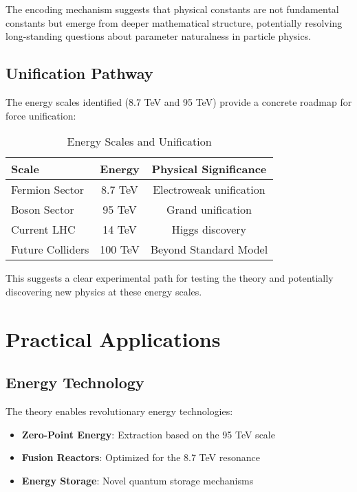 \documentclass[12pt, a4paper]{article}
\begin{document}
The encoding mechanism suggests that physical constants are not fundamental constants but emerge from deeper mathematical structure, potentially resolving long-standing questions about parameter naturalness in particle physics.

\subsection{Unification Pathway}

The energy scales identified (8.7 TeV and 95 TeV) provide a concrete roadmap for force unification:

\begin{table}[h]
\centering
\caption{Energy Scales and Unification}
\begin{tabular}{lcc}
\toprule
Scale & Energy & Physical Significance \\
\midrule
Fermion Sector & 8.7 TeV & Electroweak unification \\
Boson Sector & 95 TeV & Grand unification \\
Current LHC & 14 TeV & Higgs discovery \\
Future Colliders & 100 TeV & Beyond Standard Model \\
\bottomrule
\end{tabular}
\end{table}

This suggests a clear experimental path for testing the theory and potentially discovering new physics at these energy scales.

\section{Practical Applications}

\subsection{Energy Technology}

The theory enables revolutionary energy technologies:

\begin{itemize}
\item \textbf{Zero-Point Energy}: Extraction based on the 95 TeV scale
\item \textbf{Fusion Reactors}: Optimized for the 8.7 TeV resonance
\item \textbf{Energy Storage}: Novel quantum storage mechanisms
\end{itemize}
\end{document}
